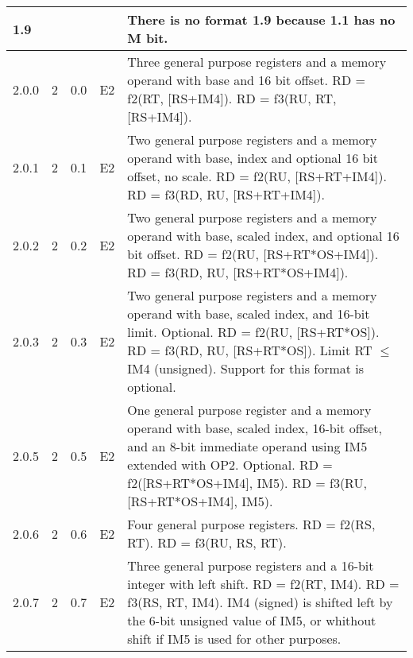 \documentclass[forwardcom.tex]{subfiles}
\begin{document}
\begin{longtable} {|p{10mm}|p{6mm}|p{9mm}|p{7mm}|p{80mm}|}
\hline
1.9 &  &  &  & There is no format 1.9 because 1.1 has no M bit.\\

\hline
2.0.0 & 2 & 0.0  & E2 & Three general purpose registers and a memory operand with base and 16 bit offset.\newline 
RD = f2(RT, [RS+IM4]). \newline 
RD = f3(RU, RT, [RS+IM4]).\\

\hline
2.0.1 & 2 & 0.1  & E2 & Two general purpose registers and a memory operand with base, index and optional 16 bit offset, no scale.\newline  
RD = f2(RU, [RS+RT+IM4]).\newline  
RD = f3(RD, RU, [RS+RT+IM4]). \\

\hline
2.0.2 & 2 & 0.2  & E2 & Two general purpose registers and a memory operand with base,  scaled index, and optional 16 bit offset.\newline   
RD = f2(RU, [RS+RT*OS+IM4]). \newline 
RD = f3(RD, RU, [RS+RT*OS+IM4]). \\

\hline
2.0.3 & 2 & 0.3  & E2 & Two general purpose registers and a memory operand with base, scaled index, and 16-bit limit. Optional. \newline 
RD = f2(RU, [RS+RT*OS]). \newline 
RD = f3(RD, RU, [RS+RT*OS]). \newline
Limit RT $\leq$ IM4 (unsigned).\newline 
Support for this format is optional. \\

\hline
2.0.5 & 2 & 0.5  & E2 & One general purpose register and a memory operand with base, scaled index, 16-bit offset, and an 8-bit immediate operand using IM5 extended with OP2.  Optional. \newline 
RD = f2([RS+RT*OS+IM4], IM5). \newline 
RD = f3(RU, [RS+RT*OS+IM4], IM5). \\ 

\hline
2.0.6 & 2 & 0.6  & E2 & Four general purpose registers.\newline 
RD = f2(RS, RT). \newline 
RD = f3(RU, RS, RT).\\

\hline
2.0.7 & 2 & 0.7  & E2 & Three general purpose registers and a 16-bit integer with left shift.\newline 
RD = f2(RT, IM4). \newline 
RD = f3(RS, RT, IM4).\newline 
IM4 (signed) is shifted left by the 6-bit unsigned value of IM5, or whithout shift if IM5 is used for other purposes. \\


\end{longtable}
\end{document}
